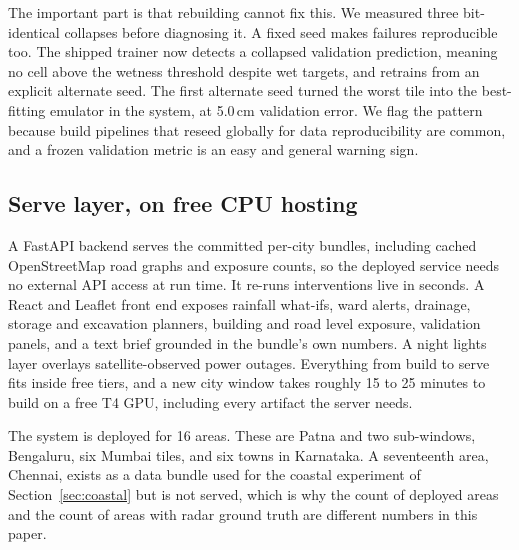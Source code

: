 The important part is that rebuilding cannot fix this. We measured three bit-identical collapses
before diagnosing it. A fixed seed makes failures reproducible too. The shipped trainer now detects
a collapsed validation prediction, meaning no cell above the wetness threshold despite wet targets,
and retrains from an explicit alternate seed. The first alternate seed turned the worst tile into
the best-fitting emulator in the system, at 5.0\,cm validation error. We flag the pattern because
build pipelines that reseed globally for data reproducibility are common, and a frozen validation
metric is an easy and general warning sign.

\subsection{Serve layer, on free CPU hosting}
A FastAPI backend serves the committed per-city bundles, including cached OpenStreetMap road graphs
\cite{osm} and exposure counts, so the deployed service needs no external API access at run time.
It re-runs interventions live in seconds. A React and Leaflet front end exposes rainfall what-ifs,
ward alerts, drainage, storage and excavation planners, building and road level exposure, validation
panels, and a text brief grounded in the bundle's own numbers. A night lights layer
\cite{roman2018} overlays satellite-observed power outages. Everything from build to serve fits
inside free tiers, and a new city window takes roughly 15 to 25 minutes to build on a free T4 GPU,
including every artifact the server needs.

The system is deployed for 16 areas. These are Patna and two sub-windows, Bengaluru, six Mumbai
tiles, and six towns in Karnataka. A seventeenth area, Chennai, exists as a data bundle used for
the coastal experiment of Section~\ref{sec:coastal} but is not served, which is why the count of
deployed areas and the count of areas with radar ground truth are different numbers in this paper.
